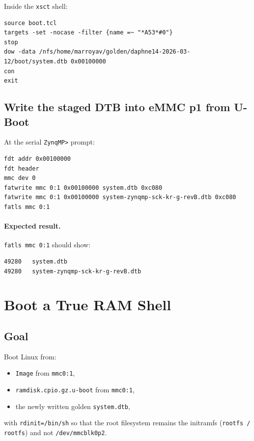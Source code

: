 \documentclass[a4paper,11pt]{article}
\begin{document}
Inside the \texttt{xsct} shell:
\begin{listing}[H]
\begin{verbatim}
source boot.tcl
targets -set -nocase -filter {name =~ "*A53*#0"}
stop
dow -data /nfs/home/marroyav/golden/daphne14-2026-03-12/boot/system.dtb 0x00100000
con
exit
\end{verbatim}
\caption{Stage the golden DTB at 0x00100000}
\end{listing}

\subsection*{Write the staged DTB into eMMC p1 from U-Boot}
At the serial \texttt{ZynqMP>} prompt:
\begin{listing}[H]
\begin{verbatim}
fdt addr 0x00100000
fdt header
mmc dev 0
fatwrite mmc 0:1 0x00100000 system.dtb 0xc080
fatwrite mmc 0:1 0x00100000 system-zynqmp-sck-kr-g-revB.dtb 0xc080
fatls mmc 0:1
\end{verbatim}
\caption{Rewrite the installed DTB with the golden one}
\end{listing}

\paragraph{Expected result.}
\texttt{fatls mmc 0:1} should show:
\begin{listing}[H]
\begin{verbatim}
49280   system.dtb
49280   system-zynqmp-sck-kr-g-revB.dtb
\end{verbatim}
\caption{Correct DTB file sizes on eMMC p1}
\end{listing}

\clearpage
\section{Boot a True RAM Shell}

\subsection*{Goal}
Boot Linux from:
\begin{itemize}
  \item \texttt{Image} from \texttt{mmc0:1},
  \item \texttt{ramdisk.cpio.gz.u-boot} from \texttt{mmc0:1},
  \item the newly written golden \texttt{system.dtb},
\end{itemize}
with \texttt{rdinit=/bin/sh} so that the root filesystem remains the
initramfs (\texttt{rootfs / rootfs}) and not \texttt{/dev/mmcblk0p2}.
\end{document}
